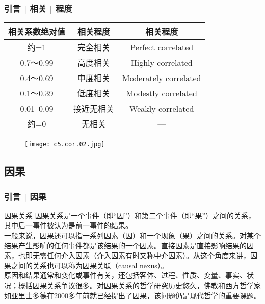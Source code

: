 \begin{frame}
  \frametitle{引言 | 相关 | 程度}
  \begin{table}
    \centering
    \begin{tabular}{ccc}
      \hline
      \rowcolor{blue!50} 相关系数绝对值 & 相关程度 & 相关程度\\
      \hline
      约=1 & 完全相关 & Perfect correlated\\
      0.7～0.99 & 高度相关 & Highly correlated\\
      0.4～0.69 & 中度相关 & Moderately correlated\\
      0.1～0.39 & 低度相关 & Modestly correlated\\
      0.01~0.09 & 接近无相关 & Weakly correlated\\
      约=0 & 无相关 & ---\\
      \hline
    \end{tabular}
  \end{table}
  \begin{figure}
    \centering
    \texttt{[image: c5.cor.02.jpg]}
  \end{figure}
\end{frame}

\subsection{因果}
\begin{frame}
  \frametitle{引言 | 因果}
  \begin{block}{因果关系}
    因果关系是一个事件（即“因”）和第二个事件（即“果”）之间的关系，其中后一事件被认为是前一事件的结果。\\
    \vspace{0.5em}
一般来说，因果还可以指一系列因素（因）和一个现象（果）之间的关系。对某个结果产生影响的任何事件都是该结果的一个因素。直接因素是直接影响结果的因素，也即无需任何介入因素（介入因素有时又称中介因素）。从这个角度来讲，因果之间的关系也可以称为因果关联（causal nexus）。\\
    \vspace{0.5em}
原因和结果通常和变化或事件有关，还包括客体、过程、性质、变量、事实、状况；概括因果关系争议很多。对因果关系的哲学研究历史悠久，佛教和西方哲学家如亚里士多德在2000多年前就已经提出了因果，该问题仍是现代哲学的重要课题。
  \end{block}
\end{frame}

